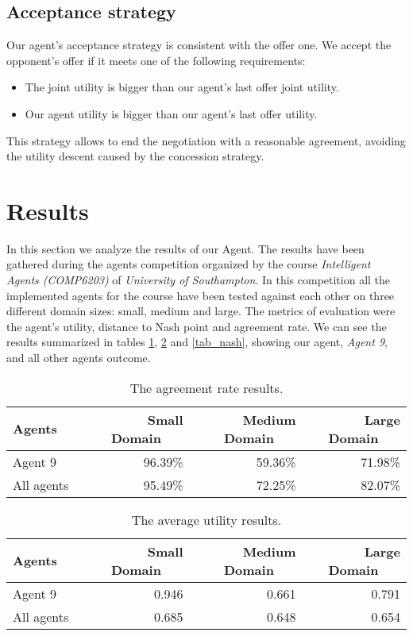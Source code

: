 \documentclass[runningheads]{llncs}
\begin{document}
\subsection{Acceptance strategy}
Our agent's acceptance strategy is consistent with the offer one. We
accept the opponent's offer if it meets one of the following
requirements:
\begin{itemize}
\item The joint utility is bigger than our agent's last offer joint
utility.
\item Our agent utility is bigger than our agent's last offer utility.
\end{itemize}
This strategy allows to end the negotiation with a reasonable
agreement, avoiding the utility descent caused by the concession
strategy.

\section{Results}\label{results}
In this section we analyze the results of our Agent. The results have
been gathered during the agents competition organized by the course
\textit{Intelligent Agents (COMP6203)} of \textit{University of
  Southampton}. In this competition all the implemented agents for the
course have been tested against each other on three different domain
sizes: small, medium and large. The metrics of evaluation were the
agent's utility, distance to Nash point and agreement rate. We can see the results
summarized in tables \ref{tab_agreement}, \ref{tab_utility} and
\ref{tab_nash}, showing our agent, \textit{Agent 9}, and all other
agents outcome.
\begin{table}[H]
\caption{The agreement rate results.}\label{tab_agreement}
\begin{tabular}{|l|r|r|r|}
\hline
\textbf{Agents}~~~ & \textbf{Small Domain}~~~ &
\textbf{Medium Domain}~~~ & \textbf{Large Domain}~~~\\
\hline
Agent 9 & 96.39\% & 59.36\% & 71.98\% \\
\hline
All agents & 95.49\% & 72.25\% & 82.07\% \\
\hline
\end{tabular}
\end{table}

\begin{table}[H]
\caption{The average utility results.}\label{tab_utility}
\begin{tabular}{|l|r|r|r|}
\hline
\textbf{Agents}~~~ & \textbf{Small Domain}~~~ &
\textbf{Medium Domain}~~~ & \textbf{Large Domain}~~~\\
\hline
Agent 9 & 0.946 & 0.661 & 0.791 \\
\hline
All agents & 0.685 & 0.648 & 0.654 \\
\hline
\end{tabular}
\end{table}
\end{document}

